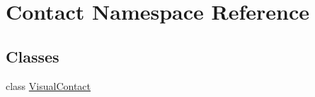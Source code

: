 \hypertarget{namespace_contact}{}\section{Contact Namespace Reference}
\label{namespace_contact}
\subsection*{Classes}
\begin{DoxyCompactItemize}
\item 
class \mbox{\hyperlink{class_contact_1_1_visual_contact}{Visual\+Contact}}
\end{DoxyCompactItemize}
